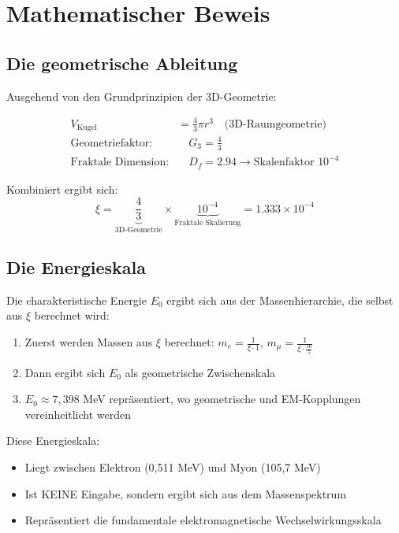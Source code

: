\documentclass[12pt,a4paper]{article}
\theoremstyle{definition}
\begin{document}
	\section{Mathematischer Beweis}
	
	\subsection{Die geometrische Ableitung}
	
	Ausgehend von den Grundprinzipien der 3D-Geometrie:
	
	\begin{align}
		V_{\text{Kugel}} &= \frac{4}{3}\pi r^3 \quad \text{(3D-Raumgeometrie)}\\
		\text{Geometriefaktor:} & \quad G_3 = \frac{4}{3}\\
		\text{Fraktale Dimension:} & \quad D_f = 2.94 \rightarrow \text{Skalenfaktor } 10^{-4}
	\end{align}
	
	Kombiniert ergibt sich:
	\begin{equation}
		\xi = \underbrace{\frac{4}{3}}_{\text{3D-Geometrie}} \times \underbrace{10^{-4}}_{\text{Fraktale Skalierung}} = 1.333 \times 10^{-4}
	\end{equation}
	
	\subsection{Die Energieskala}
	
	Die charakteristische Energie $E_0$ ergibt sich aus der Massenhierarchie, die selbst aus $\xi$ berechnet wird:
	
	\begin{enumerate}
		\item Zuerst werden Massen aus $\xi$ berechnet: $m_e = \frac{1}{\xi \cdot 1}$, $m_\mu = \frac{1}{\xi \cdot \frac{16}{5}}$
		\item Dann ergibt sich $E_0$ als geometrische Zwischenskala
		\item $E_0 \approx 7,398$ MeV repräsentiert, wo geometrische und EM-Kopplungen vereinheitlicht werden
	\end{enumerate}
	
	Diese Energieskala:
	\begin{itemize}
		\item Liegt zwischen Elektron (0,511 MeV) und Myon (105,7 MeV)
		\item Ist KEINE Eingabe, sondern ergibt sich aus dem Massenspektrum
		\item Repräsentiert die fundamentale elektromagnetische Wechselwirkungsskala
	\end{itemize}
	
\end{document}
